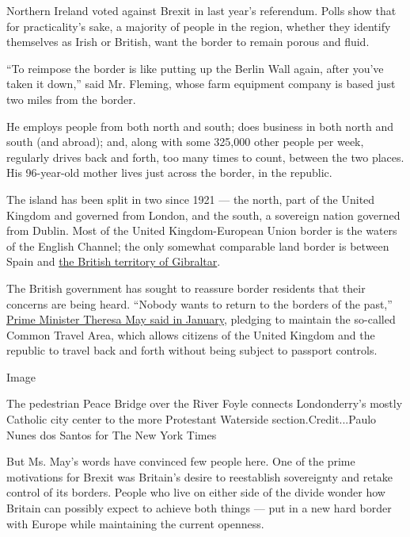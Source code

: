 Northern Ireland voted against Brexit in last year's referendum. Polls
show that for practicality's sake, a majority of people in the region,
whether they identify themselves as Irish or British, want the border to
remain porous and fluid.

``To reimpose the border is like putting up the Berlin Wall again, after
you've taken it down,'' said Mr. Fleming, whose farm equipment company
is based just two miles from the border.

He employs people from both north and south; does business in both north
and south (and abroad); and, along with some 325,000 other people per
week, regularly drives back and forth, too many times to count, between
the two places. His 96-year-old mother lives just across the border, in
the republic.

The island has been split in two since 1921 --- the north, part of the
United Kingdom and governed from London, and the south, a sovereign
nation governed from Dublin. Most of the United Kingdom-European Union
border is the waters of the English Channel; the only somewhat
comparable land border is between Spain and
\href{https://www.nytimes.com/2017/04/01/world/europe/gibraltar-brexit-spain-britain-european-union.html?rref=collection\%2Ftimestopic\%2FGibraltar\&action=click\&contentCollection=world\&region=stream\&module=stream_unit\&version=latest\&contentPlacement=2\&pgtype=collection}{the
British territory of Gibraltar}.

The British government has sought to reassure border residents that
their concerns are being heard. ``Nobody wants to return to the borders
of the past,''
\href{https://www.irishtimes.com/news/ireland/irish-news/may-nobody-wants-to-return-to-the-borders-of-the-past-1.2940087}{Prime
Minister Theresa May said in January}, pledging to maintain the
so-called Common Travel Area, which allows citizens of the United
Kingdom and the republic to travel back and forth without being subject
to passport controls.

Image

The pedestrian Peace Bridge over the River Foyle connects Londonderry's
mostly Catholic city center to the more Protestant Waterside
section.Credit...Paulo Nunes dos Santos for The New York Times

But Ms. May's words have convinced few people here. One of the prime
motivations for Brexit was Britain's desire to reestablish sovereignty
and retake control of its borders. People who live on either side of the
divide wonder how Britain can possibly expect to achieve both things ---
put in a new hard border with Europe while maintaining the current
openness.

